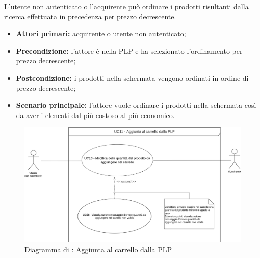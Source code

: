 L'utente non autenticato o l'acquirente può ordinare i prodotti risultanti dalla ricerca effettuata in precedenza per prezzo decrescente.
\begin{itemize}
    \item \textbf{Attori primari:} acquirente o utente non autenticato;
    \item \textbf{Precondizione:} l'attore è nella PLP e ha selezionato l'ordinamento per prezzo decrescente;
    \item \textbf{Postcondizione:} i prodotti nella schermata vengono ordinati in ordine di prezzo decrescente;
    \item \textbf{Scenario principale:} l'attore vuole ordinare i prodotti nella schermata così da averli elencati dal più costoso al più economico.
\end{itemize}


\label{aggiunta-carrello-plp}

\begin{figure}[H]
    \centering
    \includegraphics[scale=0.6]{Immagini/DiagrammiUC/Acquirente/AggiuntaProdottiCarrelloPLP.png}
    \caption{Diagramma di \actualUC: Aggiunta al carrello dalla PLP}
    \label{fig:aggiunta-carrello-plp}
\end{figure}


